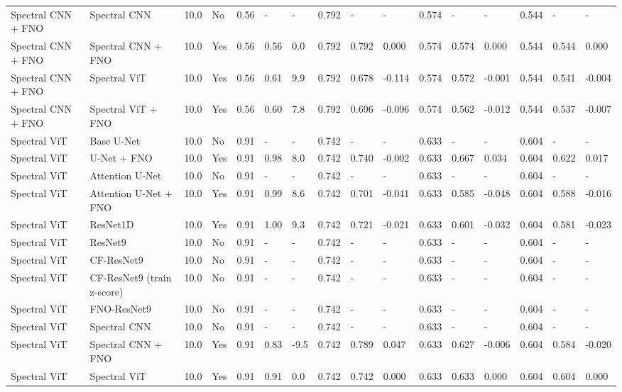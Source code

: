 \begin{longtable}{llllllllllllllll}
Spectral CNN + FNO & Spectral CNN & 10.0 & No & 0.56 & - & - & 0.792 & - & - & 0.574 & - & - & 0.544 & - & - \\
Spectral CNN + FNO & Spectral CNN + FNO & 10.0 & Yes & 0.56 & 0.56 & 0.0 & 0.792 & 0.792 & 0.000 & 0.574 & 0.574 & 0.000 & 0.544 & 0.544 & 0.000 \\
Spectral CNN + FNO & Spectral ViT & 10.0 & Yes & 0.56 & 0.61 & 9.9 & 0.792 & 0.678 & -0.114 & 0.574 & 0.572 & -0.001 & 0.544 & 0.541 & -0.004 \\
Spectral CNN + FNO & Spectral ViT + FNO & 10.0 & Yes & 0.56 & 0.60 & 7.8 & 0.792 & 0.696 & -0.096 & 0.574 & 0.562 & -0.012 & 0.544 & 0.537 & -0.007 \\
Spectral ViT & Base U-Net & 10.0 & No & 0.91 & - & - & 0.742 & - & - & 0.633 & - & - & 0.604 & - & - \\
Spectral ViT & U-Net + FNO & 10.0 & Yes & 0.91 & 0.98 & 8.0 & 0.742 & 0.740 & -0.002 & 0.633 & 0.667 & 0.034 & 0.604 & 0.622 & 0.017 \\
Spectral ViT & Attention U-Net & 10.0 & No & 0.91 & - & - & 0.742 & - & - & 0.633 & - & - & 0.604 & - & - \\
Spectral ViT & Attention U-Net + FNO & 10.0 & Yes & 0.91 & 0.99 & 8.6 & 0.742 & 0.701 & -0.041 & 0.633 & 0.585 & -0.048 & 0.604 & 0.588 & -0.016 \\
Spectral ViT & ResNet1D & 10.0 & Yes & 0.91 & 1.00 & 9.3 & 0.742 & 0.721 & -0.021 & 0.633 & 0.601 & -0.032 & 0.604 & 0.581 & -0.023 \\
Spectral ViT & ResNet9 & 10.0 & No & 0.91 & - & - & 0.742 & - & - & 0.633 & - & - & 0.604 & - & - \\
Spectral ViT & CF-ResNet9 & 10.0 & No & 0.91 & - & - & 0.742 & - & - & 0.633 & - & - & 0.604 & - & - \\
Spectral ViT & CF-ResNet9 (train z-score) & 10.0 & No & 0.91 & - & - & 0.742 & - & - & 0.633 & - & - & 0.604 & - & - \\
Spectral ViT & FNO-ResNet9 & 10.0 & No & 0.91 & - & - & 0.742 & - & - & 0.633 & - & - & 0.604 & - & - \\
Spectral ViT & Spectral CNN & 10.0 & No & 0.91 & - & - & 0.742 & - & - & 0.633 & - & - & 0.604 & - & - \\
Spectral ViT & Spectral CNN + FNO & 10.0 & Yes & 0.91 & 0.83 & -9.5 & 0.742 & 0.789 & 0.047 & 0.633 & 0.627 & -0.006 & 0.604 & 0.584 & -0.020 \\
Spectral ViT & Spectral ViT & 10.0 & Yes & 0.91 & 0.91 & 0.0 & 0.742 & 0.742 & 0.000 & 0.633 & 0.633 & 0.000 & 0.604 & 0.604 & 0.000 \\

\end{longtable}
